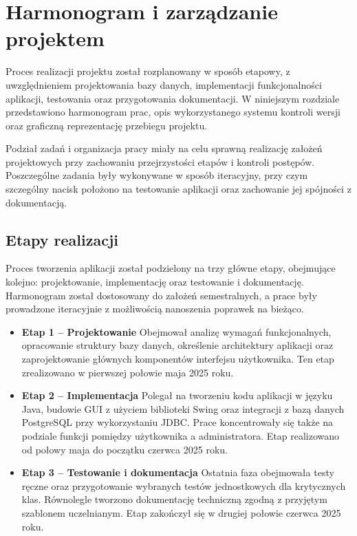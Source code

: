 \chapter{Harmonogram i zarządzanie projektem}
\label{cha:Harmonogram i zarządzanie projektem}

Proces realizacji projektu został rozplanowany w sposób etapowy, z uwzględnieniem projektowania bazy danych, implementacji funkcjonalności aplikacji, testowania oraz przygotowania dokumentacji. W niniejszym rozdziale przedstawiono harmonogram prac, opis wykorzystanego systemu kontroli wersji oraz graficzną reprezentację przebiegu projektu.

Podział zadań i organizacja pracy miały na celu sprawną realizację założeń projektowych przy zachowaniu przejrzystości etapów i kontroli postępów. Poszczególne zadania były wykonywane w sposób iteracyjny, przy czym szczególny nacisk położono na testowanie aplikacji oraz zachowanie jej spójności z dokumentacją.


\section{Etapy realizacji}

Proces tworzenia aplikacji został podzielony na trzy główne etapy, obejmujące kolejno: projektowanie, implementację oraz testowanie i dokumentację. Harmonogram został dostosowany do założeń semestralnych, a prace były prowadzone iteracyjnie z możliwością nanoszenia poprawek na bieżąco.

\begin{itemize}
    \item \textbf{Etap 1 – Projektowanie}  
    Obejmował analizę wymagań funkcjonalnych, opracowanie struktury bazy danych, określenie architektury aplikacji oraz zaprojektowanie głównych komponentów interfejsu użytkownika. Ten etap zrealizowano w pierwszej połowie maja 2025 roku.

    \item \textbf{Etap 2 – Implementacja}  
    Polegał na tworzeniu kodu aplikacji w języku Java, budowie GUI z użyciem biblioteki Swing oraz integracji z bazą danych PostgreSQL przy wykorzystaniu JDBC. Prace koncentrowały się także na podziale funkcji pomiędzy użytkownika a administratora. Etap realizowano od połowy maja do początku czerwca 2025 roku.

    \item \textbf{Etap 3 – Testowanie i dokumentacja}  
    Ostatnia faza obejmowała testy ręczne oraz przygotowanie wybranych testów jednostkowych dla krytycznych klas. Równolegle tworzono dokumentację techniczną zgodną z przyjętym szablonem uczelnianym. Etap zakończył się w drugiej połowie czerwca 2025 roku.
\end{itemize}

